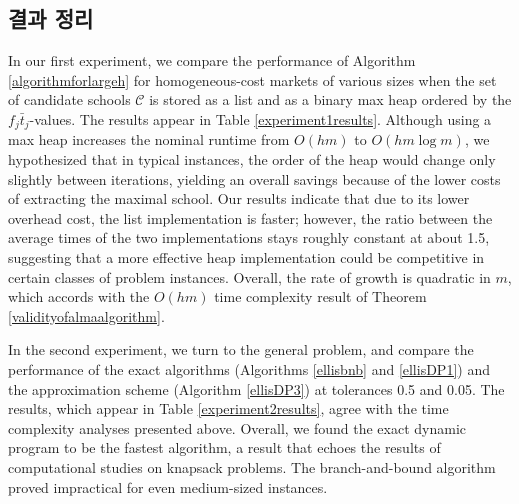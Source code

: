 \documentclass[11pt]{article} %
\newif\ifen
\theoremstyle{definition}
\theoremstyle{definition}
\begin{document}
\ifen \subsection{Summary of results} \else \subsection{결과 정리}\fi
In our first experiment, we compare the performance of Algorithm \ref{algorithmforlargeh} for homogeneous-cost markets of various sizes when the set of candidate schools $\mathcal{C}$ is stored as a list and as a binary max heap ordered by the $f_j \bar t_j$-values. The results appear in Table \ref{experiment1results}. Although using a max heap increases the nominal runtime from $O(hm)$ to $O(hm \log m)$, we hypothesized that in typical instances, the order of the heap would change only slightly between iterations, yielding an overall savings because of the lower costs of extracting the maximal school. Our results indicate that due to its lower overhead cost, the list implementation is faster; however, the ratio between the average times of the two implementations stays roughly constant at about 1.5, suggesting that a more effective heap implementation could be competitive in certain classes of problem instances. Overall, the rate of growth is quadratic in $m$, which accords with the $O(hm)$ time complexity result of Theorem \ref{validityofalmaalgorithm}.

In the second experiment, we turn to the general problem, and compare the performance of the exact algorithms (Algorithms \ref{ellisbnb} and \ref{ellisDP1}) and the approximation scheme (Algorithm \ref{ellisDP3}) at tolerances 0.5 and 0.05.  The results, which appear in Table \ref{experiment2results}, agree with the time complexity analyses presented above. Overall, we found the exact dynamic program to be the fastest algorithm, a result that echoes the results of computational studies on knapsack problems. The branch-and-bound algorithm proved impractical for even medium-sized instances. %





\newcommand{\missing}{---}
\newcommand{\lastptofcaption}{\ifen
For each value of $m$, \nmarkets~markets were generated, and the computation time was recorded as fastest of three repetitions of the algorithm. The table shows the average time (standard deviation) in milliseconds over the \nmarkets~instances.
\else 각 $m$에 대해 \nmarkets 개의 시장을 생성했으며 알고리즘을 3번 반복해서 그 중 최소 계산 시간을 기록했다. 표에서 \nmarkets 개의 인스턴스에 대한 평균 (평균편차) 시간을 밀리초 단위로 나타난다.\fi}
\end{document}
